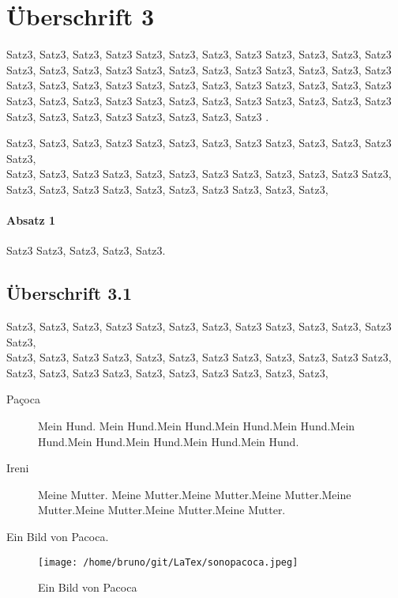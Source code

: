 \section{Überschrift 3}

    Satz3, Satz3, Satz3, Satz3 Satz3, Satz3, Satz3, Satz3 Satz3, Satz3, Satz3, Satz3 Satz3, Satz3, Satz3, Satz3 Satz3, Satz3, Satz3, Satz3 
    Satz3, Satz3, Satz3, Satz3 Satz3, Satz3, Satz3, Satz3 Satz3, Satz3, Satz3, Satz3 Satz3, Satz3, Satz3, Satz3 Satz3, Satz3, Satz3, Satz3 
    Satz3, Satz3, Satz3, Satz3 Satz3, Satz3, Satz3, Satz3 Satz3, Satz3, Satz3, Satz3 Satz3, Satz3, Satz3, Satz3 .


    Satz3, Satz3, Satz3, Satz3 Satz3, Satz3, Satz3, Satz3 Satz3, Satz3, Satz3, Satz3 Satz3, \\
    Satz3, Satz3, Satz3 Satz3, Satz3, Satz3, Satz3 
    Satz3, Satz3, Satz3, Satz3 Satz3, Satz3, Satz3, Satz3 Satz3, Satz3, Satz3, Satz3 Satz3, Satz3, Satz3,
    
    \paragraph*{Absatz 1}
    Satz3 Satz3, Satz3, Satz3, Satz3.

    \subsection{Überschrift 3.1}
    Satz3, Satz3, Satz3, Satz3 Satz3, Satz3, Satz3, Satz3 Satz3, Satz3, Satz3, Satz3 Satz3, \\
    Satz3, Satz3, Satz3 Satz3, Satz3, Satz3, Satz3 
    Satz3, Satz3, Satz3, Satz3 Satz3, Satz3, Satz3, Satz3 Satz3, Satz3, Satz3, Satz3 Satz3, Satz3, Satz3,

    \begin{description}
        \item [Paçoca] Mein Hund. Mein Hund.Mein Hund.Mein Hund.Mein Hund.Mein Hund.Mein Hund.Mein Hund.Mein Hund.Mein Hund.
        \item [Ireni] Meine Mutter. Meine Mutter.Meine Mutter.Meine Mutter.Meine Mutter.Meine Mutter.Meine Mutter.Meine Mutter.
    \end{description}


    Ein Bild von Pacoca.
    \begin{figure}[htb]
        \centering
        \texttt{[image: /home/bruno/git/LaTex/sonopacoca.jpeg]}
        \caption{Ein Bild von Pacoca}
        \label{fig:pacoca}
    \end{figure}

